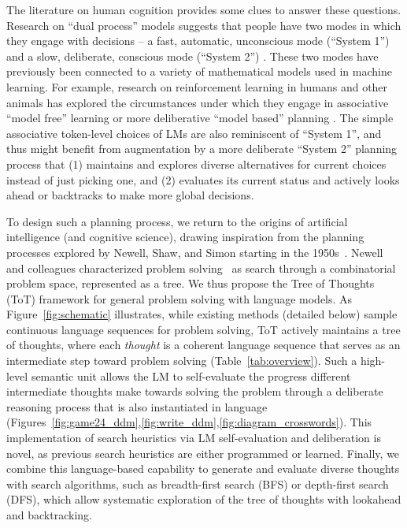 \documentclass{article}
\begin{document}
The literature on human cognition provides some clues to answer these questions.
Research on ``dual process'' models suggests that people have two modes in which they engage with decisions -- a fast, automatic, unconscious mode (``System 1'') and a slow, deliberate, conscious mode (``System 2'') \cite{sloman1996empirical,stanovich1999rational,kahneman2002representativeness,kahneman2011thinking}. 
These two modes have previously been connected to a variety of mathematical models used in machine learning. For example, research on reinforcement learning in humans and other animals has explored the circumstances under which they engage in associative ``model free'' learning or more deliberative ``model based'' planning \cite{daw2005uncertainty}. 
The simple associative token-level choices of LMs are also reminiscent of ``System 1'', and thus might benefit from augmentation by a more deliberate ``System 2'' planning process that (1) maintains and explores diverse alternatives for current choices instead of just picking one, and (2) evaluates its current status and actively looks ahead or backtracks to make more global decisions.









To design such a planning process, we return to the origins of artificial intelligence (and cognitive science), drawing inspiration from the planning processes explored by Newell, Shaw, and Simon starting in the 1950s~\cite{newell1959report,newell1972human}. Newell and colleagues characterized 
 problem solving~\cite{newell1959report}
as search through a combinatorial problem space, represented as a tree.  We thus propose the Tree of Thoughts (ToT) framework for general problem solving with language models. As Figure~\ref{fig:schematic} illustrates, while existing methods (detailed below) sample continuous language sequences for problem solving, ToT actively maintains a tree of thoughts, where each {\em thought} is a coherent language sequence that serves as an intermediate step toward problem solving (Table~\ref{tab:overview}). Such a high-level semantic unit allows the LM to self-evaluate the progress different intermediate thoughts make towards  solving the problem through a deliberate reasoning process that is also instantiated in language (Figures~\ref{fig:game24_ddm},\ref{fig:write_ddm},\ref{fig:diagram_crosswords}). This implementation of search heuristics via LM self-evaluation and deliberation is novel, as previous search heuristics are either programmed or learned. Finally, we combine this language-based capability to generate and evaluate diverse thoughts with search algorithms, such as breadth-first search (BFS) or depth-first search (DFS), which allow systematic exploration of the tree of thoughts with lookahead and backtracking.
\end{document}
